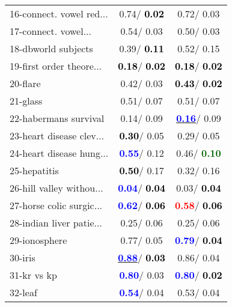 \begin{table}[h]
\begin{center}
\begin{tabular}{lc|c}
16-connect. vowel red... &   0.74/\textcolor{black}{\textbf{  0.02}} &   0.72/  0.03 \\
17-connect. vowel... &   0.54/  0.03 &   0.50/  0.03 \\
18-dbworld subjects &   0.39/\textcolor{black}{\textbf{  0.11}} &   0.52/  0.15 \\
19-first order theore... & \textcolor{black}{\textbf{  0.18}}/\textcolor{black}{\textbf{  0.02}} & \textcolor{black}{\textbf{  0.18}}/\textcolor{black}{\textbf{  0.02}} \\
20-flare &   0.42/  0.03 & \textcolor{black}{\textbf{  0.43}}/\textcolor{black}{\textbf{  0.02}} \\
21-glass &   0.51/  0.07 &   0.51/  0.07 \\ \hline
22-habermans survival &   0.14/  0.09 & \underline{\textcolor{blue}{\textbf{  0.16}}}/  0.09 \\
23-heart disease clev... & \textcolor{black}{\textbf{  0.30}}/  0.05 &   0.29/  0.05 \\
24-heart disease hung... & \textcolor{blue}{\textbf{  0.55}}/  0.12 &   0.46/\textcolor{darkgreen}{\textbf{  0.10}} \\
25-hepatitis & \textcolor{black}{\textbf{  0.50}}/  0.17 &   0.32/  0.16 \\
26-hill valley withou... & \textcolor{blue}{\textbf{  0.04}}/\textcolor{black}{\textbf{  0.04}} &   0.03/\textcolor{black}{\textbf{  0.04}} \\
27-horse colic surgic... & \textcolor{blue}{\textbf{  0.62}}/\textcolor{black}{\textbf{  0.06}} & \textcolor{red}{\textbf{  0.58}}/\textcolor{black}{\textbf{  0.06}} \\
28-indian liver patie... &   0.25/  0.06 &   0.25/  0.06 \\ \hline
29-ionosphere &   0.77/  0.05 & \textcolor{blue}{\textbf{  0.79}}/\textcolor{black}{\textbf{  0.04}} \\
30-iris & \underline{\textcolor{blue}{\textbf{  0.88}}}/\textcolor{black}{\textbf{  0.03}} &   0.86/  0.04 \\
31-kr vs kp & \textcolor{blue}{\textbf{  0.80}}/  0.03 & \textcolor{blue}{\textbf{  0.80}}/\textcolor{black}{\textbf{  0.02}} \\
32-leaf & \textcolor{blue}{\textbf{  0.54}}/  0.04 &   0.53/  0.04 \\\end{tabular}\label{stratsALCKappa0bestReduxb}
\end{center}
\end{table}
